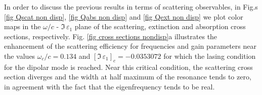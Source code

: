 \documentclass[9pt,twocolumn,twoside]{osajnl}
\begin{document}



 
In order to discuss the previous results in terms of scattering observables, 
in Fig.s \ref{fig Qscat non disp}, \ref{fig Qabs non disp} and  \ref{fig Qext non disp} 
we plot color maps in the $\omega/c$ - $\Im\,\varepsilon_1$ plane of the scattering, extinction and absorption cross sections, respectively. 
%
Fig. \ref{fig cross sections nondisp}a illustrates the enhancement of the scattering efficiency for frequencies  and gain parameters near the values $\omega_c/c=0.134$ and $[\Im\,\varepsilon_{1}]_c = -0.0353072$ for which the lasing condition for the dipolar mode is reached. Near this critical condition, the scattering cross section diverges and the width at half maximum of the resonance tends to zero, 
in agreement with the fact  that the eigenfrequency tends to be real. 
\end{document}
